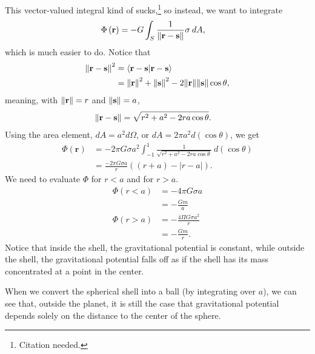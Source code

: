 \documentclass[10pt]{mypackage}
\begin{document}
\begin{example}[Gravity]
  This vector-valued integral kind of sucks,\footnote{Citation needed.} so instead, we want to integrate
  \begin{align*}
    \Phi\left(\mathbf{r}\right) &= -G\int_{S}^{} \frac{1}{\norm{\mathbf{r} - \mathbf{s}}}\sigma\:dA,
  \end{align*}
  which is much easier to do. Notice that
  \begin{align*}
    \norm{\mathbf{r} - \mathbf{s}}^2 &= \braket{\mathbf{r}-\mathbf{s}}{\mathbf{r}-\mathbf{s}}\\
                                     &= \norm{\mathbf{r}}^2 + \norm{\mathbf{s}}^2 - 2\norm{\mathbf{r}}\norm{\mathbf{s}}\cos\theta,
  \end{align*}
  meaning, with $\norm{\mathbf{r}} = r$ and $\norm{\mathbf{s}} = a$,
  \begin{align*}
    \norm{\mathbf{r} - \mathbf{s}} &= \sqrt{r^2 + a^2 - 2ra\cos\theta}.
  \end{align*}
  Using the area element, $dA = a^2d\Omega$, or $dA = 2\pi a^2d\left(\cos\theta\right)$, we get
  \begin{align*}
    \Phi\left(\mathbf{r}\right) &= -2\pi G\sigma a^2\int_{-1}^{1} \frac{1}{\sqrt{r^2 + a^2 - 2ra\cos\theta}}\:d\left(\cos\theta\right)\\
                                &= \frac{-2\pi G\sigma a}{r}\left(\left(r + a\right) - \left\vert r-a \right\vert\right).
  \end{align*}
  We need to evaluate $\Phi$ for $r < a$ and for $r > a$.
  \begin{align*}
    \Phi\left(r < a\right) &= -4\pi G\sigma a\\
                           &= -\frac{Gm}{a}\\
    \Phi\left(r > a\right) &= -\frac{4\Pi G\sigma a^2}{r}\\
                           &= -\frac{Gm}{r}.
  \end{align*}
  Notice that inside the shell, the gravitational potential is constant, while outside the shell, the gravitational potential falls off as if the shell has its mass concentrated at a point in the center.\newline

  When we convert the spherical shell into a ball (by integrating over $a$), we can see that, outside the planet, it is still the case that gravitational potential depends solely on the distance to the center of the sphere.
\end{example}
\end{document}
